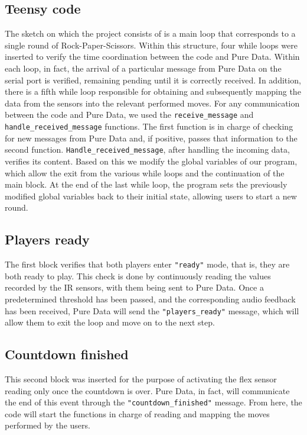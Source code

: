 \documentclass[11pt,a4paper]{report}
\begin{document}
\subsection*{Teensy code}
The sketch on which the project consists of is a main loop that corresponds to a single round of Rock-Paper-Scissors.
Within this structure, four while loops were inserted to verify the time coordination between the code and Pure Data. Within each loop, in fact, the arrival of a particular message from Pure Data on the serial port is verified, remaining pending until it is correctly received. In addition, there is a fifth while loop responsible for obtaining and subsequently mapping the data from the sensors into the relevant performed moves.
For any communication between the code and Pure Data, we used the \texttt{receive\_message} and \texttt{handle\_received\_message} functions. The first function is in charge of checking for new messages from Pure Data and, if positive, passes that information to the second function.
\texttt{Handle\_received\_message}, after handling the incoming data, verifies its content. Based on this we modify the global variables of our program, which allow the exit from the various while loops and the continuation of the main block.
At the end of the last while loop, the program sets the previously modified global variables back to their initial state, allowing users to start a new round.
\subsection*{Players ready}
The first block verifies that both players enter \texttt{"ready"} mode, that is, they are both ready to play. This check is done by continuously reading the values recorded by the IR sensors, with them being sent to Pure Data. Once a predetermined threshold has been passed, and the corresponding audio feedback has been received, Pure Data will send the \texttt{"players\_ready"} message, which will allow them to exit the loop and move on to the next step.
\subsection*{Countdown finished}
This second block was inserted for the purpose of activating the flex sensor reading only once the countdown is over. Pure Data, in fact, will communicate the end of this event through the \texttt{"countdown\_finished"} message. From here, the code will start the functions in charge of reading and mapping the moves performed by the users.
\end{document}
